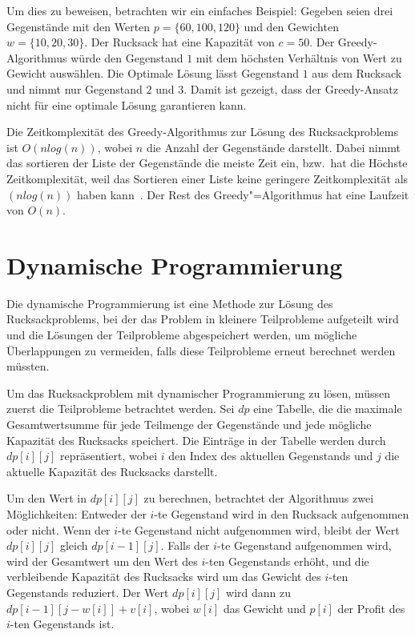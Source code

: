 Um dies zu beweisen, betrachten wir ein einfaches Beispiel: 
Gegeben seien drei Gegenstände mit den Werten $p = \{60, 100, 120\}$ 
und den Gewichten $w =\{10, 20, 30\}$. Der Rucksack hat eine Kapazität 
von $c = 50$. Der Greedy-Algorithmus würde den Gegenstand $1$ mit 
dem höchsten Verhältnis von Wert zu Gewicht auswählen. Die Optimale 
Lösung lässt Gegenstand $1$ aus dem Rucksack und nimmt nur Gegenstand $2$ und $3$.
Damit ist gezeigt, dass der Greedy-Ansatz nicht für eine optimale Lösung 
garantieren kann.

Die Zeitkomplexität des Greedy-Algorithmus zur Lösung des 
Rucksackproblems ist $O(nlog(n))$, 
wobei $n$ die Anzahl der Gegenstände darstellt. Dabei nimmt das 
sortieren der Liste der Gegenstände die meiste Zeit ein, bzw.\ hat 
die Höchste Zeitkomplexität, weil das Sortieren einer Liste 
keine geringere Zeitkomplexität als $(nlog(n))$ haben kann\ \cite[vgl. S. 191--193]{cormen2022introduction}.
Der Rest des Greedy"=Algorithmus hat eine 
Laufzeit von $O(n)$.\ \cite[vgl. S. 425ff.]{cormen2022introduction}

\section{Dynamische Programmierung}
Die dynamische Programmierung ist eine Methode zur 
Lösung des Rucksackproblems, bei der das Problem in kleinere 
Teilprobleme aufgeteilt wird und die Lösungen der Teilprobleme 
abgespeichert werden, um mögliche Überlappungen zu vermeiden, falls 
diese Teilprobleme erneut berechnet werden müssten.

Um das Rucksackproblem mit dynamischer Programmierung zu 
lösen, müssen zuerst die Teilprobleme betrachtet werden. 
Sei $dp$ eine Tabelle, die die maximale 
Gesamtwertsumme für jede Teilmenge der Gegenstände und jede 
mögliche Kapazität des Rucksacks speichert. Die Einträge in 
der Tabelle werden durch $dp[i][j]$ repräsentiert, wobei $i$ den 
Index des aktuellen Gegenstands und $j$ die aktuelle Kapazität 
des Rucksacks darstellt.

Um den Wert in $dp[i][j]$ zu berechnen, betrachtet der Algorithmus 
zwei Möglichkeiten: Entweder der $i$-te Gegenstand wird in den 
Rucksack aufgenommen oder nicht. Wenn der $i$-te Gegenstand 
nicht aufgenommen wird, bleibt der Wert $dp[i][j]$ gleich 
$dp[i-1][j]$. Falls der $i$-te Gegenstand aufgenommen wird, wird 
der Gesamtwert um den Wert des $i$-ten Gegenstands erhöht, und 
die verbleibende Kapazität des Rucksacks wird um das Gewicht 
des $i$-ten Gegenstands reduziert. Der Wert $dp[i][j]$ wird dann 
zu $dp[i-1][j-w[i]] + v[i]$, wobei $w[i]$ das Gewicht und $p[i]$ 
der Profit des $i$-ten Gegenstands ist.

